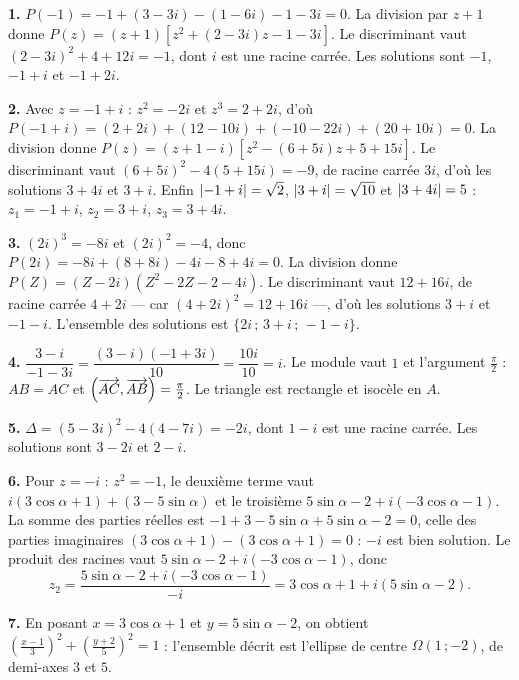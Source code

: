 \begin{corrige}[annales]
\textbf{1.} $P(-1) = -1+(3-3i)-(1-6i)-1-3i = 0$. La division par $z+1$ donne
$P(z) = (z+1)\left[z^{2}+(2-3i)z-1-3i\right]$. Le discriminant vaut
$(2-3i)^{2}+4+12i = -1$, dont $i$ est une racine carrée. Les solutions sont
$-1$, $-1+i$ et $-1+2i$.

\textbf{2.} Avec $z = -1+i$ : $z^{2} = -2i$ et $z^{3} = 2+2i$, d'où
$P(-1+i) = (2+2i)+(12-10i)+(-10-22i)+(20+10i) = 0$. La division donne
$P(z) = (z+1-i)\left[z^{2}-(6+5i)z+5+15i\right]$. Le discriminant vaut
$(6+5i)^{2}-4(5+15i) = -9$, de racine carrée $3i$, d'où les solutions
$3+4i$ et $3+i$. Enfin $\left|-1+i\right| = \sqrt2$, $\left|3+i\right| = \sqrt{10}$ et
$\left|3+4i\right| = 5$ : $z_{1} = -1+i$, $z_{2} = 3+i$, $z_{3} = 3+4i$.

\textbf{3.} $(2i)^{3} = -8i$ et $(2i)^{2} = -4$, donc
$P(2i) = -8i+(8+8i)-4i-8+4i = 0$. La division donne
$P(Z) = (Z-2i)\left(Z^{2}-2Z-2-4i\right)$. Le discriminant vaut $12+16i$, de
racine carrée $4+2i$ — car $(4+2i)^{2} = 12+16i$ —, d'où les solutions
$3+i$ et $-1-i$. L'ensemble des solutions est
$\{2i\,;\,3+i\,;\,-1-i\}$.

\textbf{4.} $\dfrac{3-i}{-1-3i} = \dfrac{(3-i)(-1+3i)}{10} = \dfrac{10i}{10}
= i$. Le module vaut $1$ et l'argument $\frac{\pi}{2}$ : $AB = AC$ et
$\left(\overrightarrow{AC},\overrightarrow{AB}\right) = \frac{\pi}{2}$. Le triangle est rectangle
et isocèle en $A$.

\textbf{5.} $\Delta = (5-3i)^{2}-4(4-7i) = -2i$, dont $1-i$ est une racine
carrée. Les solutions sont $3-2i$ et $2-i$.

\textbf{6.} Pour $z = -i$ : $z^{2} = -1$, le deuxième terme vaut
$i(3\cos\alpha+1)+(3-5\sin\alpha)$ et le troisième
$5\sin\alpha-2+i(-3\cos\alpha-1)$. La somme des parties réelles est
$-1+3-5\sin\alpha+5\sin\alpha-2 = 0$, celle des parties imaginaires
$(3\cos\alpha+1)-(3\cos\alpha+1) = 0$ : $-i$ est bien solution. Le produit
des racines vaut $5\sin\alpha-2+i(-3\cos\alpha-1)$, donc
\[
  z_{2} = \frac{5\sin\alpha-2+i(-3\cos\alpha-1)}{-i}
  = 3\cos\alpha+1+i\left(5\sin\alpha-2\right).
\]

\textbf{7.} En posant $x = 3\cos\alpha+1$ et $y = 5\sin\alpha-2$, on obtient
$\left(\frac{x-1}{3}\right)^{2}+\left(\frac{y+2}{5}\right)^{2} = 1$ :
l'ensemble décrit est l'ellipse de centre $\Omega(1\,;-2)$, de demi-axes $3$
et $5$.
\end{corrige}

